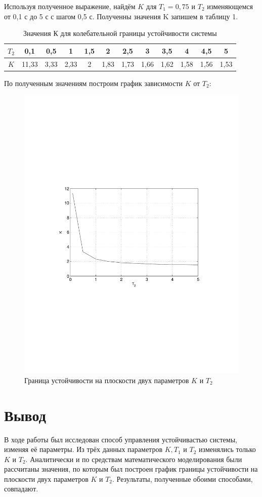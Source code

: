 \documentclass[a4paper, 11pt, russian]{article}
\begin{document}
    Используя полученное выражение, найдём $K$ для $T_1 = 0,75$ и $T_2$ изменяющемся от 0,1 с до 5 с с шагом 0,5 с. Полученны значения K запишем в таблицу 1.
    \begin{table}[h!]
        \centering
        \caption{Значения К для колебательной границы устойчивости системы}
        \begin{tabular}{|c|c|c|c|c|c|c|c|c|c|c|c|}
            \hline
            $T_2$ & 0,1 & 0,5 & 1 & 1,5 & 2 & 2,5 & 3 & 3,5 & 4 & 4,5 & 5 \\
            \hline
            $K$ & 11,33 & 3,33 & 2,33 & 2 & 1,83 & 1,73 & 1,66 & 1,62 & 1,58 & 1,56 & 1,53 \\
            \hline
        \end{tabular}
    \end{table}
    \newpage
    По полученным значениям построим график зависимости $K$ от $T_2$:
    \begin{figure}[ht!]
        \centering
        \includegraphics[width = \textwidth]{KT2graph}
        \caption{Граница устойчивости на плоскости двух параметров $K$ и $T_2$}
    \end{figure}
    \clearpage
    \section*{Вывод}
    В ходе работы был исследован способ управления устойчивастью системы, изменяя её параметры. Из трёх данных параметров $K, T_1$ и $T_2$ изменялись только $K$ и $T_2$. Аналитически и по средствам математического моделирования были рассчитаны значения, по которым был построен график границы устойчивости на плоскости двух параметров $K$ и $T_2$. Результаты, полученные обоими способами, совпадают.
\end{document}
